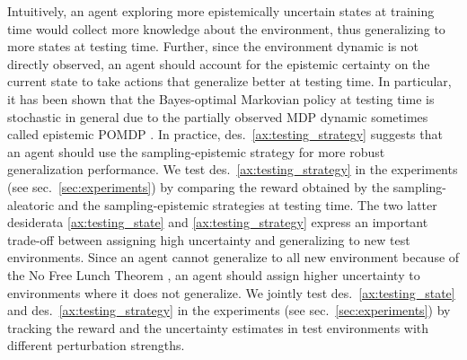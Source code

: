 Intuitively, an agent exploring more epistemically uncertain states at training time would collect more knowledge about the environment, thus generalizing to more states at testing time. Further, since the environment dynamic is not directly observed, an agent should account for the epistemic certainty on the current state to take actions that generalize better at testing time. In particular, it has been shown that the Bayes-optimal Markovian policy at testing time is stochastic in general due to the partially observed MDP dynamic sometimes called epistemic POMDP \cite{epistemic-pomdp}. In practice, des.~\ref{ax:testing_strategy} suggests that an agent should use the sampling-epistemic strategy for more robust generalization performance. We test des.~\ref{ax:testing_strategy} in the experiments (see sec.~\ref{sec:experiments}) by comparing the reward obtained by the sampling-aleatoric and the sampling-epistemic strategies at testing time. The two latter desiderata \ref{ax:testing_state} and \ref{ax:testing_strategy} express an important trade-off between assigning high uncertainty and generalizing to new test environments. Since an agent cannot generalize to all new environment because of the No Free Lunch Theorem \cite{no-free-lunch-theorem-optimization}, an agent should assign higher uncertainty to environments where it does not generalize. We jointly test des.~\ref{ax:testing_state} and des.~\ref{ax:testing_strategy} in the experiments (see sec.~\ref{sec:experiments}) by tracking the reward and the uncertainty estimates in test environments with different perturbation strengths.
